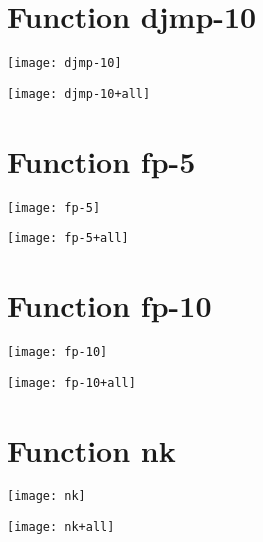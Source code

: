 \section{Function djmp-10}
\begin{center}

\end{center}
\begin{center}

\end{center}
\begin{center}
\texttt{[image: djmp-10]}
\end{center}
\begin{center}
\texttt{[image: djmp-10+all]}
\end{center}
\newpage
\section{Function fp-5}
\begin{center}

\end{center}
\begin{center}

\end{center}
\begin{center}
\texttt{[image: fp-5]}
\end{center}
\begin{center}
\texttt{[image: fp-5+all]}
\end{center}
\newpage
\section{Function fp-10}
\begin{center}

\end{center}
\begin{center}

\end{center}
\begin{center}
\texttt{[image: fp-10]}
\end{center}
\begin{center}
\texttt{[image: fp-10+all]}
\end{center}
\newpage
\section{Function nk}
\begin{center}

\end{center}
\begin{center}

\end{center}
\begin{center}
\texttt{[image: nk]}
\end{center}
\begin{center}
\texttt{[image: nk+all]}
\end{center}
\newpage
